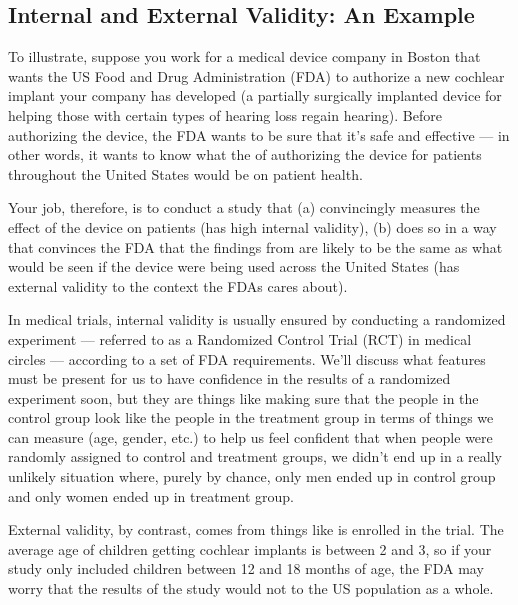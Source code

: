 \documentclass[letterpaper,10pt,english]{jupyterBook}
\begin{document}
\subsection{Internal and External Validity: An Example}
\label{\detokenize{30_questions/30_using_causal_questions:internal-and-external-validity-an-example}}
\sphinxAtStartPar
To illustrate, suppose you work for a medical device company in Boston that wants the US Food and Drug Administration (FDA) to authorize a new cochlear implant your company has developed (a partially surgically implanted device for helping those with certain types of hearing loss regain hearing). Before authorizing the device, the FDA wants to be sure that it’s safe and effective — in other words, it wants to know what the  of authorizing the device for patients throughout the United States would be on patient health.

\sphinxAtStartPar
Your job, therefore, is to conduct a study that (a) convincingly measures the effect of the device on patients (has high internal validity),  (b) does so in a way that convinces the FDA that the findings from  are likely to be the same as what would be seen if the device were being used across the United States (has external validity to the context the FDAs cares about).

\sphinxAtStartPar
In medical trials, internal validity is usually ensured by conducting a randomized experiment — referred to as a Randomized Control Trial (RCT) in medical circles — according to a set of FDA requirements. We’ll discuss what features must be present for us to have confidence in the results of a randomized experiment soon, but they are things like making sure that the people in the control group look like the people in the treatment group in terms of things we can measure (age, gender, etc.) to help us feel confident that when people were randomly assigned to control and treatment groups, we didn’t end up in a really unlikely situation where, purely by chance, only men ended up in control group and only women ended up in treatment group.

\sphinxAtStartPar
External validity, by contrast, comes from things like  is enrolled in the trial. The average age of children getting cochlear implants is between 2 and 3, so if your study only included children between 12 and 18 months of age, the FDA may worry that the results of the study would not  to the US population as a whole.
\end{document}

